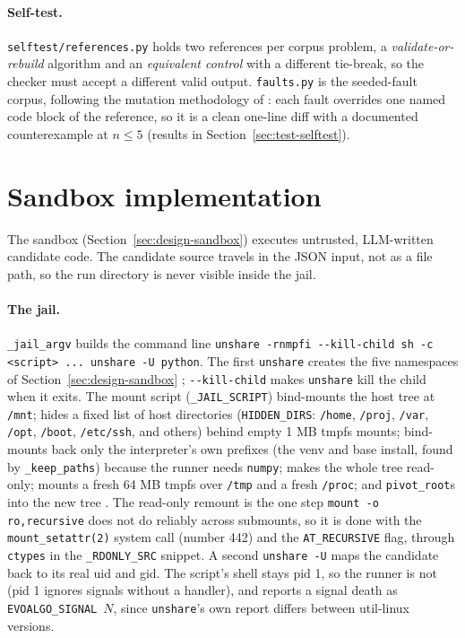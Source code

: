 \paragraph{Self-test.} \texttt{selftest/references.py} holds two references
per corpus problem, a \emph{validate-or-rebuild} algorithm and an
\emph{equivalent control} with a different tie-break, so the checker must
accept a different valid output. \texttt{faults.py} is the seeded-fault corpus,
following the mutation methodology of \citet{jia2011mutation}: each fault
overrides one named code block of the reference, so it is a clean one-line diff
with a documented counterexample at $n \le 5$ (results in
Section~\ref{sec:test-selftest}).

\section{Sandbox implementation}
\label{sec:impl-sandbox}

The sandbox (Section~\ref{sec:design-sandbox}) executes untrusted, LLM-written
candidate code. The candidate source travels in the JSON input, not as a file
path, so the run directory is never visible inside the jail.

  \paragraph{The jail.} \texttt{\_jail\_argv} builds the command line
\texttt{unshare -rnmpfi -{}-kill-child sh -c <script> ... unshare -U
python}. The first \texttt{unshare} creates the five
namespaces of Section~\ref{sec:design-sandbox} \citep{manNamespaces};
\texttt{-{}-kill-child} makes \texttt{unshare} kill the child when it exits. The
mount script (\texttt{\_JAIL\_SCRIPT}) bind-mounts the host tree at
\texttt{/mnt}; hides a fixed list of host directories (\texttt{HIDDEN\_DIRS}:
\texttt{/home}, \texttt{/proj}, \texttt{/var}, \texttt{/opt}, \texttt{/boot},
\texttt{/etc/ssh}, and others) behind empty 1 MB tmpfs mounts; bind-mounts back
only the interpreter's own prefixes (the venv and base install, found by
\texttt{\_keep\_paths}) because the runner needs \texttt{numpy}; makes the whole
tree read-only; mounts a fresh 64 MB tmpfs over \texttt{/tmp} and a fresh
\texttt{/proc}; and \texttt{pivot\_root}s into the new tree
\citep{kerrisk2010tlpi}. The read-only remount is the one step
\texttt{mount -o ro,recursive} does not do reliably across submounts, so it is
done with the \texttt{mount\_setattr(2)} system call (number 442) and the
\texttt{AT\_RECURSIVE} flag, through \texttt{ctypes} in the \texttt{\_RDONLY\_SRC}
snippet. A second \texttt{unshare -U} maps the candidate back to its real uid and
gid. The script's shell stays pid 1, so the runner is not (pid 1 ignores signals
without a handler), and reports a signal death as \texttt{EVOALGO\_SIGNAL}~$N$,
since \texttt{unshare}'s own report differs between util-linux versions.

